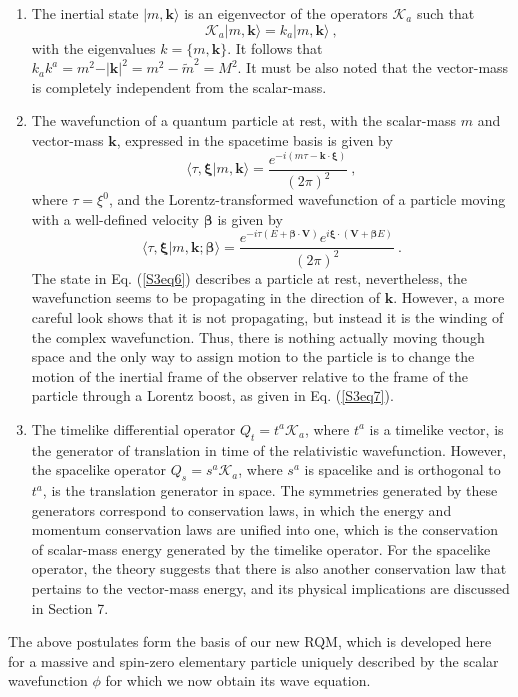 \documentclass[12pt]{iopart}
\begin{document}
\begin{enumerate}
%
\item The inertial state $\vert m,\boldsymbol{k}\rangle$ is an eigenvector of the operators 
$\mathcal{K}_a$ such that
%
	\begin{equation}
        \mathcal{K}_a\vert m,\boldsymbol{k}\rangle = k_a\vert m,\boldsymbol{k}\rangle\ ,
        \label{S3eq5}
	\end{equation}
%	
with the eigenvalues $k=\{m,\boldsymbol{k}\}$. It follows that $k_a k^a=m^2-\vert\boldsymbol{k}
\vert^2 = m^2-\tilde{m}^2 =M^2$. It must be also noted that the vector-mass is completely 
independent from the scalar-mass.
%
\item The wavefunction of a quantum particle at rest, with the scalar-mass $m$ and vector-mass 
$\boldsymbol{k}$, expressed in the spacetime basis is given by 
%
	\begin{equation}
        \langle\tau,\boldsymbol{\xi}\vert m,\boldsymbol{k}\rangle=\frac{e^{-i\left(m\tau-
        \boldsymbol{k}\cdot\boldsymbol{\xi}\right)}}{(2\pi)^2}\ ,
        \label{S3eq6}
	\end{equation}
%
where $\tau=\xi^0$, and the Lorentz-transformed wavefunction of a particle moving with a 
well-defined velocity $\boldsymbol{\beta}$ is given by
%
    \begin{equation}
        \langle\tau,\boldsymbol{\xi}\vert m,\boldsymbol{k};\boldsymbol{\beta}\rangle=
        \frac{e^{-i\tau(E+\boldsymbol{\beta}\cdot\boldsymbol{V})}e^{i\boldsymbol{\xi}
        \cdot(\boldsymbol{V}+\boldsymbol{\beta}E)}}{(2\pi)^2}\ .
        \label{S3eq7}
    \end{equation}
%
The state in Eq. (\ref{S3eq6}) describes a particle at rest, nevertheless, the wavefunction seems 
to be propagating in the direction of $\boldsymbol{k}$.  However, a more careful look shows that 
it is not propagating, but instead it is the winding of the complex wavefunction.   Thus, there is 
nothing actually moving though space and the only way to assign motion to the particle is to change 
the motion of the inertial frame of the observer relative to the frame of the particle through a Lorentz 
boost, as given in Eq. (\ref{S3eq7}).
%
\item The timelike differential operator $Q_t=t^a \mathcal{K}_a$, where $t^a$ is a timelike 
vector, is the generator of translation in time of the relativistic wavefunction.  However, the 
spacelike operator $Q_s=s^a\mathcal{K}_a$, where $s^a$ is spacelike and is orthogonal
to $t^a$, is the translation generator in space.  The symmetries generated by these generators 
correspond to conservation laws, in which the energy and momentum conservation laws are 
unified into one, which is the conservation of scalar-mass energy generated by the timelike 
operator.   For the spacelike operator, the theory suggests that there is also another conservation 
law that pertains to the vector-mass energy, and its physical implications are discussed in Section 7.
%
\end{enumerate}
%
\noindent
The above postulates form the basis of our new RQM, which is developed here for a massive 
and spin-zero elementary particle uniquely described by the scalar wavefunction $\phi$ for 
which we now obtain its wave equation.
\end{document}
